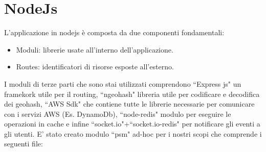 \section{NodeJs}
L'applicazione in nodejs è composta da due componenti fondamentali:
\begin{itemize}
	\item Moduli: librerie usate all'interno dell'applicazione.
	\item Routes: identificatori di risorse esposte all'esterno.
\end{itemize}
I moduli di terze parti che sono stai utilizzati comprendono ``Express js" un framekork utile per il routing, ``ngeohash" libreria utile per codificare e decodifica dei geohash, ``AWS Sdk" che contiene tutte le librerie necessarie per comunicare con i servizi AWS (Es. DynamoDb), ``node-redis" modulo per eseguire le operazioni in cache e infine ``socket.io"+``socket.io-redis" per notificare gli eventi a gli utenti.
E' stato creato modulo ``psm" ad-hoc per i nostri scopi che comprende i seguenti file:
